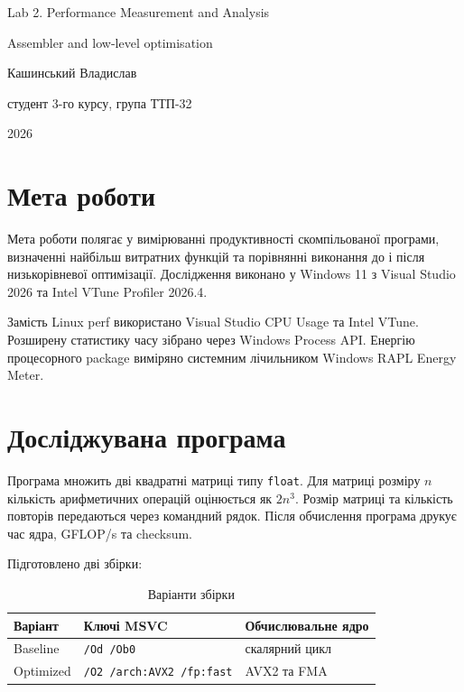 \documentclass[12pt,a4paper]{article}
\begin{document}
\begin{titlepage}
\centering
\vspace*{25mm}
{\Large Lab 2. Performance Measurement and Analysis\par}
\vspace{4mm}
{\large Assembler and low-level optimisation\par}
\vfill
{\large Кашинський Владислав\par}
\vspace{2mm}
{\large студент 3-го курсу, група ТТП-32\par}
\vfill
{\large 2026\par}
\end{titlepage}

\tableofcontents
\newpage

\section{Мета роботи}

Мета роботи полягає у вимірюванні продуктивності скомпільованої програми, визначенні найбільш витратних функцій та порівнянні виконання до і після низькорівневої оптимізації. Дослідження виконано у Windows 11 з Visual Studio 2026 та Intel VTune Profiler 2026.4.

Замість Linux perf використано Visual Studio CPU Usage та Intel VTune. Розширену статистику часу зібрано через Windows Process API. Енергію процесорного package виміряно системним лічильником Windows RAPL Energy Meter.

\section{Досліджувана програма}

Програма множить дві квадратні матриці типу \texttt{float}. Для матриці розміру $n$ кількість арифметичних операцій оцінюється як $2n^3$. Розмір матриці та кількість повторів передаються через командний рядок. Після обчислення програма друкує час ядра, GFLOP/s та checksum.

Підготовлено дві збірки:

\begin{table}[H]
\centering
\begin{tabularx}{\textwidth}{@{}lXX@{}}
\toprule
Варіант & Ключі MSVC & Обчислювальне ядро \\
\midrule
Baseline & \texttt{/Od /Ob0} & скалярний цикл \\
Optimized & \texttt{/O2 /arch:AVX2 /fp:fast} & AVX2 та FMA \\
\bottomrule
\end{tabularx}
\caption{Варіанти збірки}
\end{table}
\end{document}
